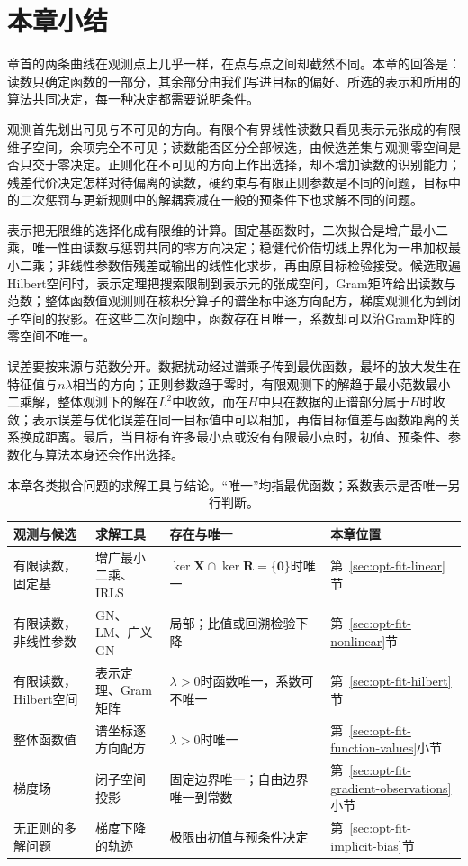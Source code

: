 \section{本章小结}
\label{sec:opt-fit-summary}

章首的两条曲线在观测点上几乎一样，在点与点之间却截然不同。本章的回答是：读数只确定函数的一部分，其余部分由我们写进目标的偏好、所选的表示和所用的算法共同决定，每一种决定都需要说明条件。

观测首先划出可见与不可见的方向。有限个有界线性读数只看见表示元张成的有限维子空间，余项完全不可见；读数能否区分全部候选，由候选差集与观测零空间是否只交于零决定。正则化在不可见的方向上作出选择，却不增加读数的识别能力；残差代价决定怎样对待偏离的读数，硬约束与有限正则参数是不同的问题，目标中的二次惩罚与更新规则中的解耦衰减在一般的预条件下也求解不同的问题。

表示把无限维的选择化成有限维的计算。固定基函数时，二次拟合是增广最小二乘，唯一性由读数与惩罚共同的零方向决定；稳健代价借切线上界化为一串加权最小二乘；非线性参数借残差或输出的线性化求步，再由原目标检验接受。候选取遍Hilbert空间时，表示定理把搜索限制到表示元的张成空间，Gram矩阵给出读数与范数；整体函数值观测则在核积分算子的谱坐标中逐方向配方，梯度观测化为到闭子空间的投影。在这些二次问题中，函数存在且唯一，系数却可以沿Gram矩阵的零空间不唯一。

误差要按来源与范数分开。数据扰动经过谱乘子传到最优函数，最坏的放大发生在特征值与$n\lambda$相当的方向；正则参数趋于零时，有限观测下的解趋于最小范数最小二乘解，整体观测下的解在$L^2$中收敛，而在$H$中只在数据的正谱部分属于$H$时收敛；表示误差与优化误差在同一目标值中可以相加，再借目标值差与函数距离的关系换成距离。最后，当目标有许多最小点或没有有限最小点时，初值、预条件、参数化与算法本身还会作出选择。

\begin{table}[!htbp]
  \centering
  \small
  \begin{tabular}{@{}>{\raggedright\arraybackslash}p{22mm}>{\raggedright\arraybackslash}p{23mm}>{\raggedright\arraybackslash}p{32mm}>{\raggedright\arraybackslash}p{15mm}@{}}
    \toprule
    观测与候选 & 求解工具 & 存在与唯一 & 本章位置\\
    \midrule
    有限读数，固定基 & 增广最小二乘、IRLS & $\ker\bm X\cap\ker\bm R=\{\bm0\}$时唯一 & 第~\ref{sec:opt-fit-linear}节\\
    有限读数，非线性参数 & GN、LM、广义GN & 局部；比值或回溯检验下降 & 第~\ref{sec:opt-fit-nonlinear}节\\
    有限读数，Hilbert空间 & 表示定理、Gram矩阵 & $\lambda>0$时函数唯一，系数可不唯一 & 第~\ref{sec:opt-fit-hilbert}节\\
    整体函数值 & 谱坐标逐方向配方 & $\lambda>0$时唯一 & 第~\ref{sec:opt-fit-function-values}小节\\
    梯度场 & 闭子空间投影 & 固定边界唯一；自由边界唯一到常数 & 第~\ref{sec:opt-fit-gradient-observations}小节\\
    无正则的多解问题 & 梯度下降的轨迹 & 极限由初值与预条件决定 & 第~\ref{sec:opt-fit-implicit-bias}节\\
    \bottomrule
  \end{tabular}
  \caption{本章各类拟合问题的求解工具与结论。“唯一”均指最优函数；系数表示是否唯一另行判断。}
  \label{tab:opt-fit-summary}
\end{table}

